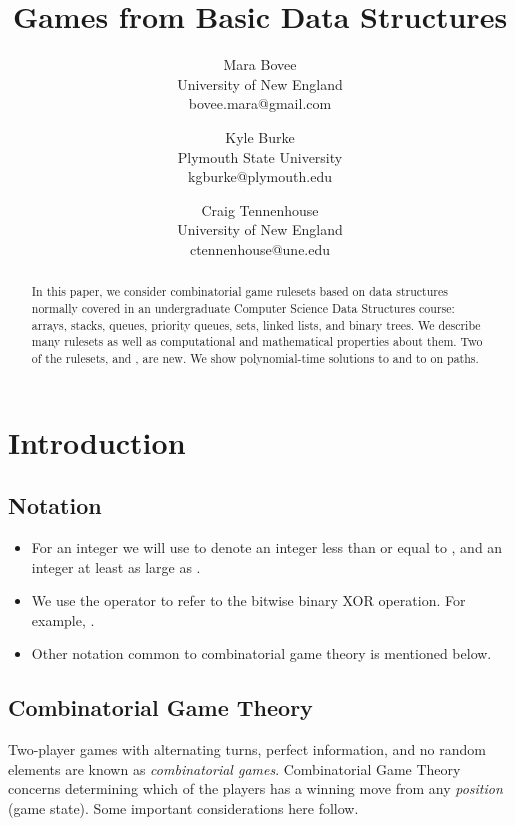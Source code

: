 \documentclass[letter,10pt]{article}
\title{Games from Basic Data Structures}
\author{Mara Bovee \\University of New England\\bovee.mara@gmail.com \and Kyle Burke\\Plymouth State University\\ kgburke@plymouth.edu \and Craig Tennenhouse\\University of New England\\ctennenhouse@une.edu}
\begin{document}
\maketitle

\begin{abstract}
  In this paper, we consider combinatorial game rulesets based on data structures normally covered in an undergraduate Computer Science Data Structures course: arrays, stacks, queues, priority queues, sets, linked lists, and binary trees.  We describe many rulesets as well as computational and mathematical properties about them.  Two of the rulesets,  and , are new.  We show polynomial-time solutions to  and to  on paths.
\end{abstract}

\section{Introduction}

\subsection{Notation}

\begin{itemize}
    \item For an integer  we will use  to denote an integer less than or equal to , and  an integer at least as large as .

    \item We use the  operator to refer to the bitwise binary XOR operation.  For example, .

    \item Other notation common to combinatorial game theory is mentioned below.
\end{itemize}

\subsection{Combinatorial Game Theory}

Two-player games with alternating turns, perfect information, and no random elements are known as \emph{combinatorial games}.  Combinatorial Game Theory concerns determining which of the players has a winning move from any \emph{position} (game state).  Some important considerations here follow.
\end{document}
